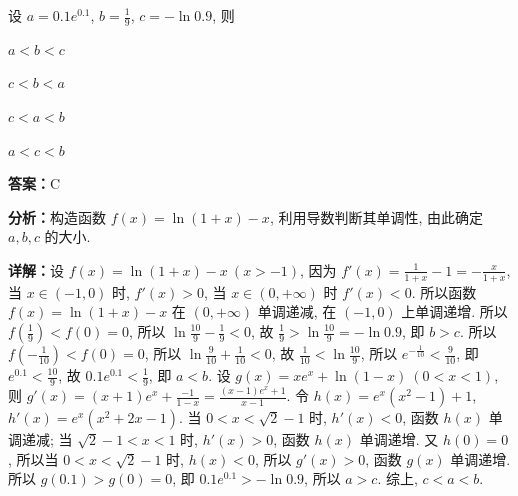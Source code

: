 \begin{question}[points=5]
设 $a = 0.1e^{0.1}$, $b = \frac{1}{9}$, $c = -\ln 0.9$, 则
\begin{choices}
  \item $a < b < c$
  \item $c < b < a$
  \item $c < a < b$
  \item $a < c < b$
\end{choices}
\begin{solution}
\textbf{答案：}C

\textbf{分析：}构造函数 $f(x) = \ln(1+x) - x$, 利用导数判断其单调性, 由此确定 $a, b, c$ 的大小.

\textbf{详解：}设 $f(x) = \ln(1+x) - x\ (x > -1)$, 因为 $f'(x) = \frac{1}{1+x} - 1 = -\frac{x}{1+x}$, 当 $x \in (-1, 0)$ 时, $f'(x) > 0$, 当 $x \in (0, +\infty)$ 时 $f'(x) < 0$. 所以函数 $f(x) = \ln(1+x) - x$ 在 $(0, +\infty)$ 单调递减, 在 $(-1, 0)$ 上单调递增. 所以 $f(\frac{1}{9}) < f(0) = 0$, 所以 $\ln\frac{10}{9} - \frac{1}{9} < 0$, 故 $\frac{1}{9} > \ln\frac{10}{9} = -\ln 0.9$, 即 $b > c$. 所以 $f(-\frac{1}{10}) < f(0) = 0$, 所以 $\ln\frac{9}{10} + \frac{1}{10} < 0$, 故 $\frac{1}{10} < \ln\frac{10}{9}$, 所以 $e^{-\frac{1}{10}} < \frac{9}{10}$, 即 $e^{0.1} < \frac{10}{9}$, 故 $0.1e^{0.1} < \frac{1}{9}$, 即 $a < b$. 设 $g(x) = xe^x + \ln(1-x)\ (0 < x < 1)$, 则 $g'(x) = (x+1)e^x + \frac{-1}{1-x} = \frac{(x-1)e^x + 1}{x-1}$. 令 $h(x) = e^x(x^2-1)+1$, $h'(x) = e^x(x^2+2x-1)$. 当 $0 < x < \sqrt{2}-1$ 时, $h'(x) < 0$, 函数 $h(x)$ 单调递减; 当 $\sqrt{2}-1 < x < 1$ 时, $h'(x) > 0$, 函数 $h(x)$ 单调递增. 又 $h(0)=0$, 所以当 $0 < x < \sqrt{2}-1$ 时, $h(x) < 0$, 所以 $g'(x) > 0$, 函数 $g(x)$ 单调递增. 所以 $g(0.1) > g(0)=0$, 即 $0.1e^{0.1} > -\ln 0.9$, 所以 $a > c$. 综上, $c < a < b$.
\end{solution}
\end{question}

